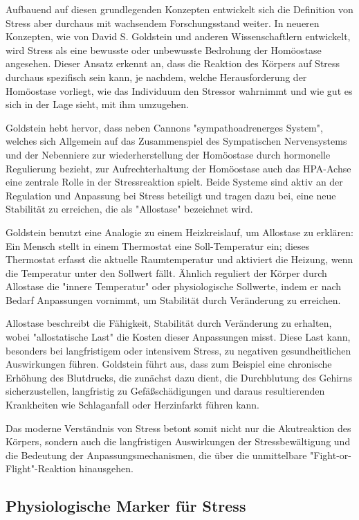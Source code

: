 Aufbauend auf diesen grundlegenden Konzepten entwickelt sich die Definition von Stress aber durchaus mit wachsendem Forschungsstand weiter. 
In neueren Konzepten, wie von David S. Goldstein und anderen Wissenschaftlern entwickelt, wird Stress als eine bewusste oder unbewusste Bedrohung der 
Homöostase angesehen. Dieser Ansatz erkennt an, dass die Reaktion des Körpers auf Stress durchaus spezifisch sein kann, je nachdem, welche Herausforderung 
der Homöostase vorliegt, wie das Individuum den Stressor wahrnimmt und wie gut es sich in der Lage sieht, mit ihm umzugehen.

Goldstein hebt hervor, dass neben Cannons "sympathoadrenerges System", welches sich Allgemein auf das Zusammenspiel des Sympatischen Nervensystems 
und der Nebenniere zur wiederherstellung der Homöostase durch hormonelle Regulierung bezieht, zur Aufrechterhaltung der Homöostase auch das \ac{HPA-Achse}
eine zentrale Rolle in der Stressreaktion spielt. Beide Systeme sind aktiv an der Regulation und Anpassung bei Stress beteiligt und tragen dazu bei, eine 
neue Stabilität zu erreichen, die als "Allostase" bezeichnet wird.

Goldstein benutzt eine Analogie zu einem Heizkreislauf, um Allostase zu erklären: Ein Mensch stellt in einem Thermostat 
eine Soll-Temperatur ein; dieses Thermostat erfasst die aktuelle Raumtemperatur und aktiviert die Heizung, wenn die Temperatur unter den Sollwert fällt. 
Ähnlich reguliert der Körper durch Allostase die "innere Temperatur" oder physiologische Sollwerte, indem er nach Bedarf Anpassungen vornimmt, 
um Stabilität durch Veränderung zu erreichen.

Allostase beschreibt die Fähigkeit, Stabilität durch Veränderung zu erhalten, wobei "allostatische Last" die Kosten dieser Anpassungen misst. 
Diese Last kann, besonders bei langfristigem oder intensivem Stress, zu negativen gesundheitlichen Auswirkungen führen. Goldstein führt aus, 
dass zum Beispiel eine chronische Erhöhung des Blutdrucks, die zunächst dazu dient, die Durchblutung des Gehirns sicherzustellen, langfristig zu 
Gefäßschädigungen und daraus resultierenden Krankheiten wie Schlaganfall oder Herzinfarkt führen kann. \cite{Gold2007}

Das moderne Verständnis von Stress betont somit nicht nur die Akutreaktion des Körpers, sondern auch die langfristigen Auswirkungen der Stressbewältigung 
und die Bedeutung der Anpassungsmechanismen, die über die unmittelbare "Fight-or-Flight"-Reaktion hinausgehen.

\subsection{Physiologische Marker für Stress}

